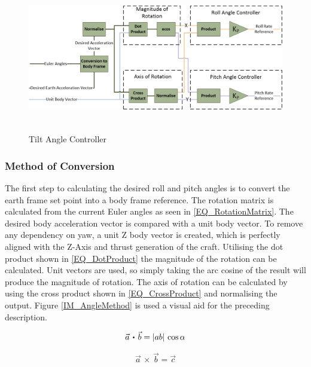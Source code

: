 	\begin{figure}[H]
		\centering
		\includegraphics[height = 6.5cm]{../References/Diagrams/TiltAngleController.jpg}
		\caption{Tilt Angle Controller}
		\label{IM_TiltAngleController}
	\end{figure}
		
		\subsubsection{Method of Conversion}	
		The first step to calculating the desired roll and pitch angles is to convert the earth frame set point into a body frame reference. The rotation matrix is calculated from the current Euler angles as seen in \eqref{EQ_RotationMatrix}.
		The desired body acceleration vector is compared with a unit body vector. To remove any dependency on yaw, a unit Z body vector is created, which is perfectly aligned with the Z-Axis and thrust generation of the craft. Utilising the dot product shown in \eqref{EQ_DotProduct} the magnitude of the rotation can be calculated. Unit vectors are used, so simply taking the arc cosine of the result will produce the magnitude of rotation. The axis of rotation can be calculated by using the cross product shown in \eqref{EQ_CrossProduct} and normalising the output. Figure \ref{IM_AngleMethod} is used a visual aid for the preceding description.
		
 		\begin{equation}
 		\label{EQ_DotProduct}
 		\vec{a} \, \bigcdot \, \vec{b} = |ab|\,\cos \alpha
 		\end{equation}
 		
 		\begin{equation}
 		\label{EQ_CrossProduct}
 		\vec{a} \, \times \, \vec{b} = \vec{c}
 		\end{equation}
		
